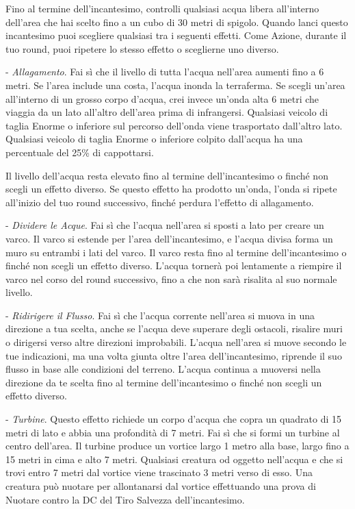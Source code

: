\begin{multicols}{2}
Fino al termine dell'incantesimo, controlli qualsiasi acqua libera all'interno dell'area che hai scelto fino a un cubo di 30 metri di spigolo. Quando lanci questo incantesimo puoi scegliere qualsiasi tra i seguenti effetti. Come Azione, durante il tuo round, puoi ripetere lo stesso effetto o sceglierne uno diverso.

\medskip

- \emph{Allagamento}. Fai sì che il livello di tutta l'acqua nell'area aumenti fino a 6 metri. Se l'area include una costa, l'acqua inonda la terraferma. Se scegli un'area all'interno di un grosso corpo d'acqua, crei invece un'onda alta 6 metri che viaggia da un lato all'altro dell'area prima di infrangersi. Qualsiasi veicolo di taglia Enorme o inferiore sul percorso dell'onda viene trasportato dall'altro lato. Qualsiasi veicolo di taglia Enorme o inferiore colpito dall'acqua ha una percentuale del 25\% di cappottarsi.

Il livello dell'acqua resta elevato fino al termine dell'incantesimo o finché non scegli un effetto diverso. Se questo effetto ha prodotto un'onda, l'onda si ripete all'inizio del tuo round successivo, finché perdura l'effetto di allagamento.

- \emph{Dividere le Acque}. Fai sì che l'acqua nell'area si sposti a lato per creare un varco. Il varco si estende per l'area dell'incantesimo, e l'acqua divisa forma un muro su entrambi i lati del varco. Il varco resta fino al termine dell'incantesimo o finché non scegli un effetto diverso. L'acqua tornerà poi lentamente a riempire il varco nel corso del round successivo, fino a che non sarà risalita al suo normale livello.

- \emph{Ridirigere il Flusso}. Fai sì che l'acqua corrente nell'area si muova in una direzione a tua scelta, anche se l'acqua deve superare degli ostacoli, risalire muri o dirigersi verso altre direzioni improbabili. L'acqua nell'area si muove secondo le tue indicazioni, ma una volta giunta oltre l'area dell'incantesimo, riprende il suo flusso in base alle condizioni del terreno. L'acqua continua a muoversi nella direzione da te scelta fino al termine dell'incantesimo o finché non scegli un effetto diverso.

- \emph{Turbine}. Questo effetto richiede un corpo d'acqua che copra un quadrato di 15 metri di lato e abbia una profondità di 7 metri. Fai sì che si formi un turbine al centro dell'area. Il turbine produce un vortice largo 1 metro alla base, largo fino a 15 metri in cima e alto 7 metri. Qualsiasi creatura od oggetto nell'acqua e che si trovi entro 7 metri dal vortice viene trascinato 3 metri verso di esso. Una creatura può nuotare per allontanarsi dal vortice effettuando una prova di Nuotare contro la DC del Tiro Salvezza dell'incantesimo.


\end{multicols}
